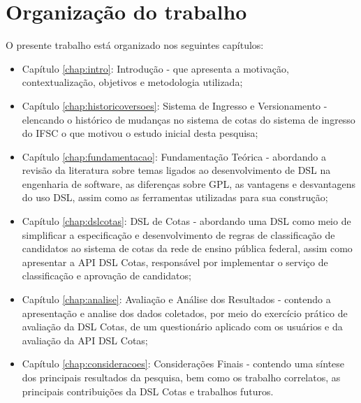 \section{Organização do trabalho}
\label{organizacao}

O presente trabalho está organizado nos seguintes capítulos:

\begin{itemize}
    \item Capítulo \ref{chap:intro}: Introdução - que apresenta a motivação, contextualização, objetivos e metodologia utilizada;
    \item Capítulo \ref{chap:historicoversoes}: Sistema de Ingresso e Versionamento - elencando o histórico de mudanças no sistema de cotas do sistema de ingresso do \gls{IFSC} o que motivou o estudo inicial desta pesquisa;
    \item Capítulo \ref{chap:fundamentacao}: Fundamentação Teórica - abordando a revisão da literatura sobre temas ligados ao desenvolvimento de \gls{DSL} na engenharia de software, as diferenças sobre \gls{GPL}, as vantagens e desvantagens do uso  \gls{DSL}, assim como as ferramentas utilizadas para sua construção;
    \item Capítulo \ref{chap:dslcotas}: DSL de Cotas - abordando uma \gls{DSL} como meio de simplificar a especificação e desenvolvimento de regras de classificação de candidatos ao sistema de cotas da rede de ensino pública federal, assim como apresentar a \gls{API} DSL Cotas, responsável por implementar o serviço de classificação e aprovação de candidatos;
    \item Capítulo \ref{chap:analise}: Avaliação e Análise dos Resultados - contendo a apresentação e analise dos dados coletados, por meio do exercício prático de avaliação da DSL Cotas, de um questionário aplicado com os usuários e da avaliação da
    \gls{API} DSL Cotas;
    \item Capítulo \ref{chap:consideracoes}: Considerações Finais - contendo uma síntese dos principais resultados da pesquisa, bem como os trabalho correlatos, as principais contribuições da DSL Cotas e trabalhos futuros.
\end{itemize}
